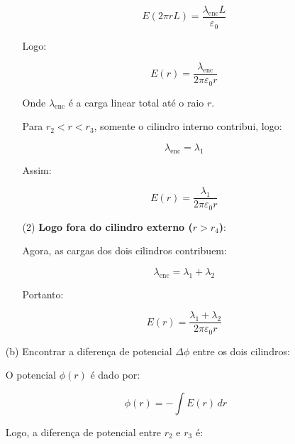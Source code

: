 \documentclass[a4paper,12pt]{article}
\begin{document}
\begin{flushleft}
\begin{itemize}
\begin{itemize}
        \begin{equation}
        E(2\pi r L) = \frac{\lambda_{\text{enc}} L}{\varepsilon_0}
        \end{equation}
        
        Logo:

        \begin{equation}
        E(r) = \frac{\lambda_{\text{enc}}}{2\pi\varepsilon_0 r}
        \end{equation}

        Onde $\lambda_{\text{enc}}$ é a carga linear total até o raio $r$.

        Para $r_2 < r < r_3$, somente o cilindro interno contribui, logo:

        \begin{equation}
        \lambda_{\text{enc}} = \lambda_1
        \end{equation}

        Assim:

        \begin{equation}
        E(r) = \frac{\lambda_1}{2\pi\varepsilon_0 r}
        \end{equation}

        \item[(2)] \textbf{Logo fora do cilindro externo ($r > r_4$)}:

        Agora, as cargas dos dois cilindros contribuem:

        \begin{equation}
        \lambda_{\text{enc}} = \lambda_1 + \lambda_2
        \end{equation}

        Portanto:

        \begin{equation}
        E(r) = \frac{\lambda_1 + \lambda_2}{2\pi\varepsilon_0 r}
        \end{equation}
    \end{itemize}

    \item[(b)] Encontrar a diferença de potencial $\Delta\phi$ entre os dois cilindros:

    O potencial $\phi(r)$ é dado por:

    \begin{equation}
    \phi(r) = -\int E(r) \, dr
    \end{equation}

    Logo, a diferença de potencial entre $r_2$ e $r_3$ é:


\end{itemize}
\end{flushleft}
\end{document}
